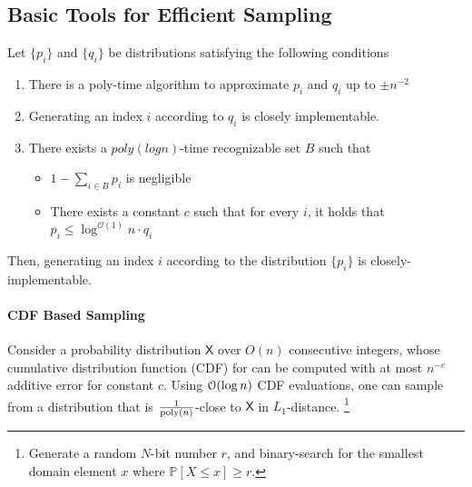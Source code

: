 \subsection{Basic Tools for Efficient Sampling}
\label{sec:basic_tools_for_efficient_sampling}
\begin{lemma}
\label{lem:rejection_sampling}
Let $\{p_i\}$ and $\{q_i\}$ be distributions satisfying the following conditions
\begin{enumerate}
    \item There is a poly-time algorithm to approximate $p_i$ and $q_i$ up to $\pm n^{-2}$
    \item Generating an index $i$ according to $q_i$ is closely implementable.
    \item There exists a $poly(log n)$-time recognizable set $B$ such that
    \begin{itemize}
        \item $1-\sum\limits_{i\in B} p_i$ is negligible
        \item There exists a constant $c$ such that for every $i$, it holds that $p_i\le \log^{\mathcal{O}(1)} n\cdot q_i$
    \end{itemize}
\end{enumerate}
Then, generating an index $i$ according to the distribution $\{p_i\}$ is closely-implementable.
\end{lemma}

\paragraph*{CDF Based Sampling}
\label{par:cdf_based_sampling}

Consider a probability distribution $\mathsf{X}$ over $O(n)$ consecutive integers,
whose cumulative distribution function (CDF) for can be computed with at most $n^{-c}$ additive error for constant $c$.
Using $\Bo(\log n)$ CDF evaluations, one can sample from a distribution that is $\frac{1}{\mathrm{poly}(n)}$-close to $\mathsf{X}$ in $L_1$-distance.
\footnote{Generate a random $N$-bit number $r$, and binary-search for the smallest domain element $x$ where $\mathbb P[X\leq x] \geq r$.}







